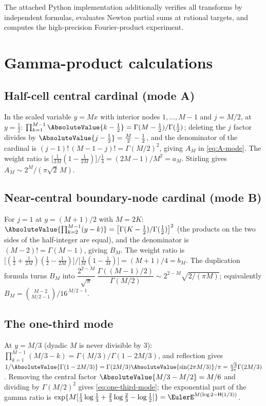 The attached Python implementation additionally verifies all transforms by
independent formulas, evaluates Newton partial sums at rational targets, and
computes the high-precision Fourier-product experiment.


\section{Gamma-product calculations}
\label{app:gamma}

\subsection{Half-cell central cardinal (mode A)}
In the scaled variable $y=Mx$ with interior nodes $1,\dots,M-1$ and
$j=M/2$, at $y=\tfrac12$:
$\prod_{k=1}^{M-1}\AbsoluteValue{k-\tfrac12}=\Gamma(M-\tfrac12)/\Gamma(\tfrac12)$;
deleting the $j$ factor divides by $\AbsoluteValue{j-\tfrac12}=\tfrac M2-\tfrac12$,
and the denominator of the cardinal is
$(j-1)!\,(M-1-j)!=\Gamma(M/2)^{2}$, giving $A_M$ in
\eqref{eq:A-mode}.  The weight ratio is
$\bigl[\tfrac1{2M}(1-\tfrac1{2M})\bigr]/\tfrac14=(2M-1)/M^{2}=a_M$.
Stirling gives $A_M\sim2^{M}/(\pi\sqrt2\,M)$.

\subsection{Near-central boundary-node cardinal (mode B)}
For $j=1$ at $y=(M+1)/2$ with $M=2K$:
$\AbsoluteValue{\prod_{k=2}^{M-1}(y-k)}
=\bigl[\Gamma(K-\tfrac12)/\Gamma(\tfrac12)\bigr]^{2}$
(the products on the two sides of the half-integer are equal), and
the denominator is $(M-2)!=\Gamma(M-1)$, giving $B_M$.  The weight
ratio is
$\bigl[(\tfrac12+\tfrac1{2M})(\tfrac12-\tfrac1{2M})\bigr]
/\bigl[\tfrac1M(1-\tfrac1M)\bigr]=(M+1)/4=b_M$.  The duplication
formula turns $B_M$ into
$\dfrac{2^{2-M}}{\sqrt\pi}\,
\dfrac{\Gamma((M-1)/2)}{\Gamma(M/2)}
\sim2^{2-M}\sqrt{2/(\pi M)}$; equivalently
$B_M=\binom{M-2}{M/2-1}\big/16^{\,M/2-1}$.

\subsection{The one-third mode}
At $y=M/3$ (dyadic $M$ is never divisible by $3$):
$\prod_{k=1}^{M-1}(M/3-k)=\Gamma(M/3)/\Gamma(1-2M/3)$, and reflection
gives $1/\AbsoluteValue{\Gamma(1-2M/3)}
=\Gamma(2M/3)\AbsoluteValue{\sin(2\pi M/3)}/\pi
=\tfrac{\sqrt3}{2\pi}\Gamma(2M/3)$.  Removing the central factor
$\AbsoluteValue{M/3-M/2}=M/6$ and dividing by $\Gamma(M/2)^{2}$ gives
\eqref{eq:one-third-mode}; the exponential part of the gamma ratio is
$\exp\{M[\tfrac13\log\tfrac13+\tfrac23\log\tfrac23-\log\tfrac12]\}
=\EulerE^{M(\log2-\Hyp(1/3))}$.


